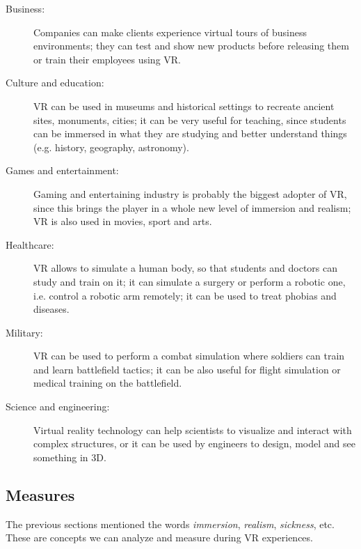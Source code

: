 \documentclass[binding=0.6cm,LaM]{sapthesis}
\begin{document}
\begin{description}

\item[Business:] Companies can make clients experience virtual tours of business environments; they can test and show new products before releasing them or train their employees using VR.

\item[Culture and education:] VR can be used in museums and historical settings to recreate ancient sites, monuments, cities; it can be
very useful for teaching, since students can be immersed in what they are studying and better understand things (e.g. history, geography, astronomy).

\item[Games and entertainment:] Gaming and entertaining industry is probably the biggest adopter of VR, since this brings the player in a whole new level of immersion and realism; VR is also used in movies, sport and arts.

\item[Healthcare:] VR allows to simulate a human body, so that students and doctors can study and train on it; it can simulate a surgery or perform a robotic one, i.e. control a robotic arm remotely; it can be used to treat phobias and diseases.

\item[Military:] VR can be used to perform a combat simulation where soldiers can train and learn battlefield tactics; it can be also useful for flight simulation or medical training on the battlefield.  

\item[Science and engineering:] Virtual reality technology can help scientists to visualize and interact with complex structures, or it can be used by engineers to design, model and see something in 3D. 

\end{description}


\subsection{Measures}
\label{sec:measures}
The previous sections mentioned the words \textit{immersion}, \textit{realism}, \textit{sickness}, etc. These are concepts we can analyze and measure during VR experiences. 
\end{document}
